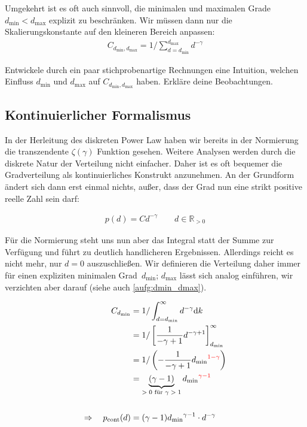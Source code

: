 \def\dmin{\ensuremath{{d_{\text{min}}}}}
\def\dmax{\ensuremath{{d_{\text{max}}}}}
\def\dnc{\ensuremath{{d_{\text{nc}}}}}

Umgekehrt ist es oft auch sinnvoll, die minimalen und maximalen Grade $\dmin < \dmax$ explizit zu beschränken.
Wir müssen dann nur die Skalierungskonstante auf den kleineren Bereich anpassen:
\begin{align}
    C_{\dmin,\dmax} = 1 / \sum_{d = \dmin}^\dmax d^{-\gamma}
\end{align}

\begin{exercise}\label{aufg:dmin_dmax}
    Entwickele durch ein paar stichprobenartige Rechnungen eine Intuition, welchen Einfluss $\dmin$ und $\dmax$ auf $C_{\dmin,\dmax}$ haben.
    Erkläre deine Beobachtungen.
\end{exercise}

\subsection{Kontinuierlicher Formalismus}
In der Herleitung des diskreten Power Law haben wir bereits in der Normierung die transzendente $\zeta(\gamma)$ Funktion gesehen.
Weitere Analysen werden durch die diskrete Natur der Verteilung nicht einfacher.
Daher ist es oft bequemer die Gradverteilung als kontinuierliches Konstrukt anzunehmen.
An der Grundform ändert sich dann erst einmal nichts, außer, dass der Grad nun eine strikt positive reelle Zahl sein darf:

\begin{align}
    p(d) = C d^{-\gamma} \quad\quad d \in \mathbb R_{> 0}
\end{align}

Für die Normierung steht uns nun aber das Integral statt der Summe zur Verfügung und führt zu deutlich handlicheren Ergebnissen.
Allerdings reicht es nicht mehr, nur $d = 0$ auszuschließen.
Wir definieren die Verteilung daher immer für einen expliziten minimalen Grad~\dmin; \dmax{} lässt sich analog einführen, wir verzichten aber darauf (siehe auch \cref{aufg:dmin_dmax}).

\begin{align}
    C_\dmin                           & = 1 / \int_{d=\dmin}^\infty d^{-\gamma} \intd k                                                \\
                                      & = 1 / \left[ \frac{1}{-\gamma + 1} d^{-\gamma + 1}  \right]_\dmin^\infty                       \\
                                      & = 1 / \left( - \frac{1}{-\gamma + 1} \dmin^{\textcolor{red}{1 - \gamma}}  \right)              \\
                                      & = \underbrace{( \gamma-1)}_{\text{$> 0$ für $\gamma > 1$}} \dmin^{\textcolor{red}{\gamma - 1}} \\
    \nonumber                                                                                                                          \\
    \Rightarrow\quad p_\text{cont}(d) & = (\gamma-1) \dmin^{\gamma - 1} \cdot d^{-\gamma}
\end{align}


